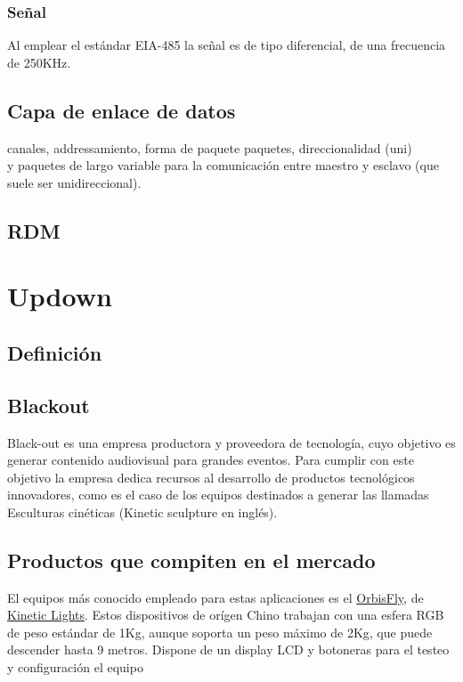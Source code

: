 \subsubsection{Señal}
Al emplear el estándar EIA-485 la señal es de tipo diferencial, de una frecuencia de 250KHz.


\subsection{Capa de enlace de datos}
\textcolor{FIXME}{canales, addressamiento, forma de paquete paquetes, direccionalidad (uni)}\\
y paquetes de largo variable para la comunicación entre maestro y esclavo (que suele ser unidireccional).

\subsection{RDM}




\section{Updown}
\subsection{Definición}

\subsection{Blackout}
Black-out es una empresa productora y proveedora de tecnología, cuyo objetivo es generar contenido audiovisual para grandes eventos. Para cumplir con este objetivo la empresa dedica recursos al desarrollo de productos tecnológicos innovadores, como es el caso de los equipos destinados a generar las llamadas Esculturas cinéticas (Kinetic sculpture en inglés).\\

\subsection{Productos que compiten en el mercado}
El equipos más conocido empleado para estas aplicaciones es el \href{http://www.eastsunlite.com/p31.html}{OrbisFly}, de \href{https://www.kinetic-lights.com/}{Kinetic Lights}. Estos dispositivos de orígen Chino trabajan con una esfera RGB de peso estándar de 1Kg, aunque soporta un peso máximo de 2Kg, que puede descender hasta 9 metros. Dispone de un display LCD y botoneras para el testeo y configuración el equipo\\

